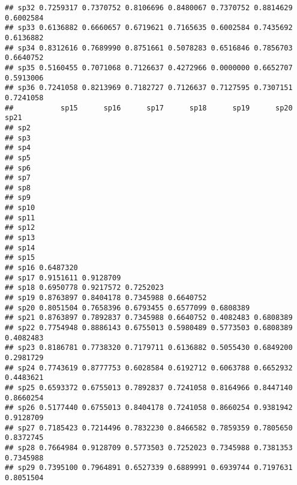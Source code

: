 \documentclass[
]{book}
\begin{document}
\begin{verbatim}
## sp32 0.7259317 0.7370752 0.8106696 0.8480067 0.7370752 0.8814629 0.6002584
## sp33 0.6136882 0.6660657 0.6719621 0.7165635 0.6002584 0.7435692 0.6136882
## sp34 0.8312616 0.7689990 0.8751661 0.5078283 0.6516846 0.7856703 0.6640752
## sp35 0.5160455 0.7071068 0.7126637 0.4272966 0.0000000 0.6652707 0.5913006
## sp36 0.7241058 0.8213969 0.7182727 0.7126637 0.7127595 0.7307151 0.7241058
##           sp15      sp16      sp17      sp18      sp19      sp20      sp21
## sp2                                                                       
## sp3                                                                       
## sp4                                                                       
## sp5                                                                       
## sp6                                                                       
## sp7                                                                       
## sp8                                                                       
## sp9                                                                       
## sp10                                                                      
## sp11                                                                      
## sp12                                                                      
## sp13                                                                      
## sp14                                                                      
## sp15                                                                      
## sp16 0.6487320                                                            
## sp17 0.9151611 0.9128709                                                  
## sp18 0.6950778 0.9217572 0.7252023                                        
## sp19 0.8763897 0.8404178 0.7345988 0.6640752                              
## sp20 0.8051504 0.7658396 0.6793455 0.6577099 0.6808389                    
## sp21 0.8763897 0.7892837 0.7345988 0.6640752 0.4082483 0.6808389          
## sp22 0.7754948 0.8886143 0.6755013 0.5980489 0.5773503 0.6808389 0.4082483
## sp23 0.8186781 0.7738320 0.7179711 0.6136882 0.5055430 0.6849200 0.2981729
## sp24 0.7743619 0.8777753 0.6028584 0.6192712 0.6063788 0.6652932 0.4483621
## sp25 0.6593372 0.6755013 0.7892837 0.7241058 0.8164966 0.8447140 0.8660254
## sp26 0.5177440 0.6755013 0.8404178 0.7241058 0.8660254 0.9381942 0.9128709
## sp27 0.7185423 0.7214496 0.7832230 0.8466582 0.7859359 0.7805650 0.8372745
## sp28 0.7664984 0.9128709 0.5773503 0.7252023 0.7345988 0.7381353 0.7345988
## sp29 0.7395100 0.7964891 0.6527339 0.6889991 0.6939744 0.7197631 0.8051504

\end{verbatim}
\end{document}
